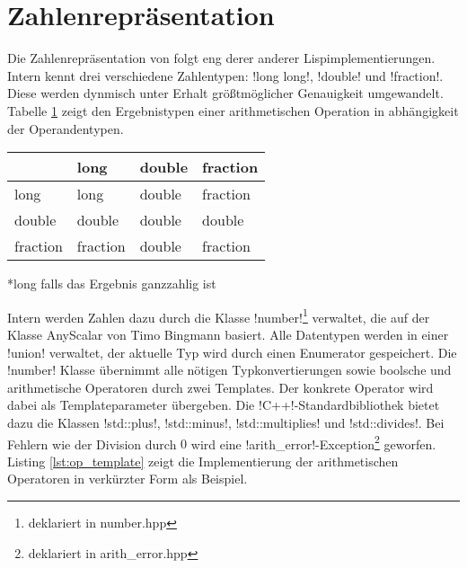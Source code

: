 \section{Zahlenrepräsentation}
\label{sec:numbers}

Die Zahlenrepräsentation von \projectname{} folgt eng derer anderer Lispimplementierungen. Intern kennt \projectname{} drei verschiedene Zahlentypen: !long long!, !double! und !fraction!. Diese werden dynmisch unter Erhalt größtmöglicher Genauigkeit umgewandelt. Tabelle \ref{tab:typeconversion} zeigt den Ergebnistypen einer arithmetischen Operation in abhängigkeit der Operandentypen.
\begin{table}[htbp]
	\centering
	\begin{threeparttable}
		\begin{tabular*}{0.6\linewidth}{l|lll}
					&long	&double	&fraction\\
			\hline
			long		&long	&double	&fraction\\
			double	&double	&double	&double\\
			fraction	&fraction&double	&fraction\tnote{*}\\
		\end{tabular*}
		\begin{tablenotes}
			\item{*}long falls das Ergebnis ganzzahlig ist
		\end{tablenotes}
		\label{tab:typeconversion}
	\end{threeparttable}
\end{table}
Intern werden Zahlen dazu durch die Klasse !number!\footnote{deklariert in number.hpp} verwaltet, die auf der Klasse AnyScalar von Timo Bingmann basiert. Alle Datentypen werden in einer !union! verwaltet, der aktuelle Typ wird durch einen Enumerator gespeichert. Die !number! Klasse übernimmt alle nötigen Typkonvertierungen sowie boolsche und arithmetische Operatoren durch zwei Templates. Der konkrete Operator wird dabei als Templateparameter übergeben. Die !C++!-Standardbibliothek bietet dazu die Klassen !std::plus!, !std::minus!, !std::multiplies! und !std::divides!. Bei Fehlern wie der Division durch $0$ wird eine !arith_error!-Exception\footnote{deklariert in arith\_error.hpp} geworfen. Listing \ref{lst:op_template} zeigt die Implementierung der arithmetischen Operatoren in verkürzter Form als Beispiel.
